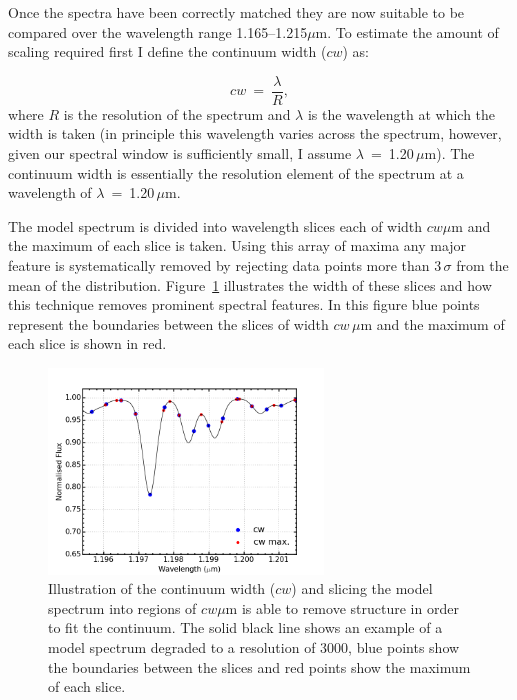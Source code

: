 Once the spectra have been correctly matched they are now suitable to be compared over the wavelength range 1.165--1.215$\mu$m.
To estimate the amount of scaling required first I define the continuum width ($cw$) as:

\begin{equation}
    cw~=~\frac{\lambda}{R}, %
\end{equation}
\noindent where $R$ is the resolution of the spectrum and
$\lambda$ is the wavelength at which the width is taken
(in principle this wavelength varies across the spectrum, however, given our spectral window is sufficiently small, I assume $\lambda$~=~1.20\,$\mu$m).
The continuum width is essentially the resolution element of the spectrum at a wavelength of
$\lambda$~=~1.20\,$\mu$m.

The model spectrum is divided into wavelength slices each of width $cw\mu$m and the maximum of each slice is taken.
Using this array of maxima any major feature is systematically removed by rejecting data points more than 3\,$\sigma$ from the mean of the distribution.
Figure~\ref{fig:cw} illustrates the width of these slices and how this technique removes prominent spectral features.
In this figure blue points represent the boundaries between the slices of width $cw\,\mu$m and the maximum of each slice is shown in red.


\begin{figure}
 \centering
\includegraphics[width=0.65\textwidth]{JAnal/cw}
\caption[Illustration of continuum width slices and maxima]{
Illustration of the continuum width ($cw$) and slicing the model spectrum into regions of $cw\mu$m is able to remove structure in order to fit the continuum.
The solid black line shows an example of a model spectrum degraded to a resolution of 3000,
blue points show the boundaries between the slices and red points show the maximum of each slice.\label{fig:cw}
         }
\end{figure}


